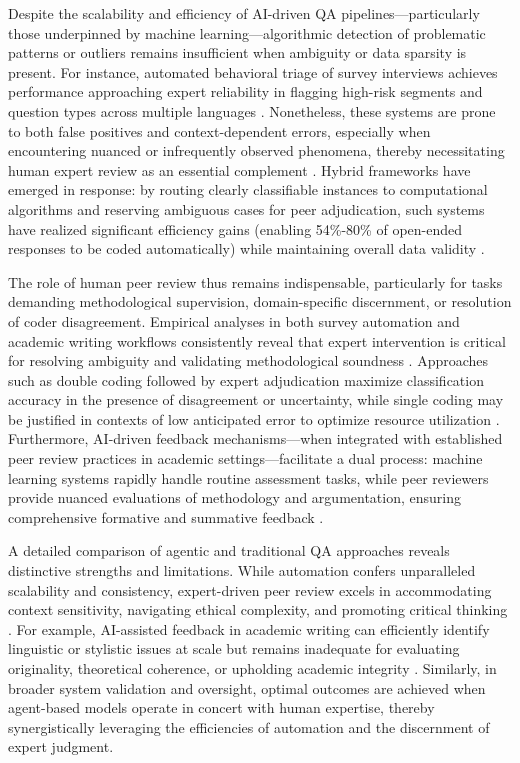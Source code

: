 \documentclass[sigconf]{acmart}
\begin{document}
Despite the scalability and efficiency of AI-driven QA pipelines—particularly those underpinned by machine learning—algorithmic detection of problematic patterns or outliers remains insufficient when ambiguity or data sparsity is present. For instance, automated behavioral triage of survey interviews achieves performance approaching expert reliability in flagging high-risk segments and question types across multiple languages \cite{ref97}\cite{ref98}. Nonetheless, these systems are prone to both false positives and context-dependent errors, especially when encountering nuanced or infrequently observed phenomena, thereby necessitating human expert review as an essential complement \cite{ref92}\cite{ref96}. Hybrid frameworks have emerged in response: by routing clearly classifiable instances to computational algorithms and reserving ambiguous cases for peer adjudication, such systems have realized significant efficiency gains (enabling 54\%-80\% of open-ended responses to be coded automatically) while maintaining overall data validity \cite{ref88}\cite{ref89}\cite{ref91}\cite{ref92}\cite{ref98}.

The role of human peer review thus remains indispensable, particularly for tasks demanding methodological supervision, domain-specific discernment, or resolution of coder disagreement. Empirical analyses in both survey automation and academic writing workflows consistently reveal that expert intervention is critical for resolving ambiguity and validating methodological soundness \cite{ref88}\cite{ref89}\cite{ref91}\cite{ref92}\cite{ref96}\cite{ref98}\cite{ref108}. Approaches such as double coding followed by expert adjudication maximize classification accuracy in the presence of disagreement or uncertainty, while single coding may be justified in contexts of low anticipated error to optimize resource utilization \cite{ref89}\cite{ref91}. Furthermore, AI-driven feedback mechanisms—when integrated with established peer review practices in academic settings—facilitate a dual process: machine learning systems rapidly handle routine assessment tasks, while peer reviewers provide nuanced evaluations of methodology and argumentation, ensuring comprehensive formative and summative feedback \cite{ref108}.

A detailed comparison of agentic and traditional QA approaches reveals distinctive strengths and limitations. While automation confers unparalleled scalability and consistency, expert-driven peer review excels in accommodating context sensitivity, navigating ethical complexity, and promoting critical thinking \cite{ref112}\cite{ref113}\cite{ref114}\cite{ref115}. For example, AI-assisted feedback in academic writing can efficiently identify linguistic or stylistic issues at scale but remains inadequate for evaluating originality, theoretical coherence, or upholding academic integrity \cite{ref112}\cite{ref113}. Similarly, in broader system validation and oversight, optimal outcomes are achieved when agent-based models operate in concert with human expertise, thereby synergistically leveraging the efficiencies of automation and the discernment of expert judgment. 
\end{document}
